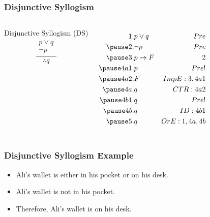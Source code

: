 \documentclass[dvipsnames]{beamer}
\begin{document}
\begin{frame}
  \frametitle{Disjunctive Syllogism}

  \begin{columns}
    \begin{block}{Disjunctive Syllogism (DS)}
      \[
      \frac
        {
          \begin{array}{c}
            p \vee q\\
            \neg p
          \end{array}
        }
        {
          \therefore q
        }
      \]
    \end{block}

    \pause
    \begin{eqnarray*}
      1.   & p \vee q        & Pre\\
      \pause
      2.   & \neg p          & Pre\\
      \pause
      3.   & p \rightarrow F & 2\\
      \pause
      4a1. & p               & Pre!\\
      \pause
      4a2. & F               & ImpE:3,4a1\\
      \pause
      4a.  & q               & CTR:4a2\\
      \pause
      4b1. & q               & Pre!\\
      \pause
      4b.  & q               & ID:4b1\\
      \pause
      5.   & q               & OrE:1,4a,4b
    \end{eqnarray*}
  \end{columns}
\end{frame}

\begin{frame}
  \frametitle{Disjunctive Syllogism Example}

  \begin{example}
    \begin{itemize}
      \item Ali's wallet is either in his pocket or on his desk.
      \item Ali's wallet is not in his pocket.

      \pause
      \medskip
      \item Therefore, Ali's wallet is on his desk.
    \end{itemize}
  \end{example}
\end{frame}
\end{document}
